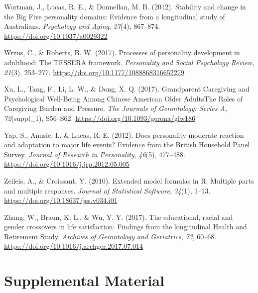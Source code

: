 \documentclass[
  english,
  man,floatsintext]{apa7}
\begin{document}
\leavevmode\hypertarget{ref-wortmanStabilityChangeBig2012}{}%
Wortman, J., Lucas, R. E., \& Donnellan, M. B. (2012). Stability and change in the Big Five personality domains: Evidence from a longitudinal study of Australians. \emph{Psychology and Aging}, \emph{27}(4), 867--874. \url{https://doi.org/10.1037/a0029322}

\leavevmode\hypertarget{ref-wrzusProcessesPersonalityDevelopment2017}{}%
Wrzus, C., \& Roberts, B. W. (2017). Processes of personality development in adulthood: The TESSERA framework. \emph{Personality and Social Psychology Review}, \emph{21}(3), 253--277. \url{https://doi.org/10.1177/1088868316652279}

\leavevmode\hypertarget{ref-xuGrandparentCaregivingPsychological2017}{}%
Xu, L., Tang, F., Li, L. W., \& Dong, X. Q. (2017). Grandparent Caregiving and Psychological Well-Being Among Chinese American Older AdultsThe Roles of Caregiving Burden and Pressure. \emph{The Journals of Gerontology: Series A}, \emph{72}(suppl\_1), S56--S62. \url{https://doi.org/10.1093/gerona/glw186}

\leavevmode\hypertarget{ref-yapDoesPersonalityModerate2012}{}%
Yap, S., Anusic, I., \& Lucas, R. E. (2012). Does personality moderate reaction and adaptation to major life events? Evidence from the British Household Panel Survey. \emph{Journal of Research in Personality}, \emph{46}(5), 477--488. \url{https://doi.org/10.1016/j.jrp.2012.05.005}

\leavevmode\hypertarget{ref-R-Formula}{}%
Zeileis, A., \& Croissant, Y. (2010). Extended model formulas in R: Multiple parts and multiple responses. \emph{Journal of Statistical Software}, \emph{34}(1), 1--13. \url{https://doi.org/10.18637/jss.v034.i01}

\leavevmode\hypertarget{ref-zhangEducationalRacialGender2017}{}%
Zhang, W., Braun, K. L., \& Wu, Y. Y. (2017). The educational, racial and gender crossovers in life satisfaction: Findings from the longitudinal Health and Retirement Study. \emph{Archives of Gerontology and Geriatrics}, \emph{73}, 60--68. \url{https://doi.org/10.1016/j.archger.2017.07.014}

\endgroup

\newpage

\hypertarget{appendix-appendix}{%
\appendix}


\renewcommand{\appendixname}{\textcolor{white}{.}}

\hypertarget{supplemental-material}{%
\section{Supplemental Material}\label{supplemental-material}}
\end{document}
